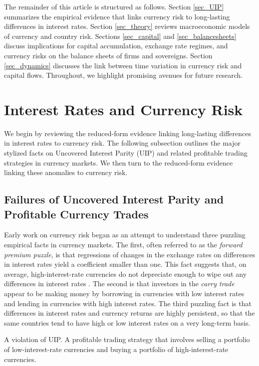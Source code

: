 \documentclass{ar-1col}
\begin{document}
The remainder of this article is structured as follows. Section \ref{sec_UIP} summarizes the empirical evidence that links currency risk to long-lasting differences in interest rates. Section \ref{sec_theory} reviews macroeconomic models of currency and country risk. Sections \ref{sec_capital} and \ref{sec_balancesheets} discuss implications for capital accumulation, exchange rate regimes, and currency risks on the balance sheets of firms and sovereigns.  Section \ref{sec_dynamics} discusses the link between time variation in currency risk and capital flows. Throughout, we highlight promising avenues for future research.


\section{Interest Rates and Currency Risk \label{sec_UIP}}

We begin by reviewing the reduced-form evidence linking long-lasting differences in interest rates to currency risk. The following subsection outlines the major stylized facts on Uncovered Interest Parity (UIP) and related profitable trading strategies in currency markets. We then turn to the reduced-form evidence linking these anomalies to currency risk. 

\subsection{Failures of
  Uncovered Interest Parity and Profitable Currency Trades }

Early work on currency risk began as an attempt to understand three puzzling empirical facts in currency markets. The first, often referred to as the \textit{forward premium puzzle}, is that regressions of changes in the exchange rates on differences in interest rates yield a coefficient smaller than one. This fact suggests that, on average, high-interest-rate currencies do not depreciate enough to wipe out any differences in interest rates \citep{Bilson1981, Fama1984}. The second is that investors in the \textit{carry trade} appear to be making money by borrowing in currencies with low interest rates and lending in currencies with high interest rates. The third puzzling fact is that differences in interest rates and currency returns are highly persistent, so that the same countries tend to have high or low interest rates on a very long-term basis.

\begin{marginnote}[]
   {A violation of UIP. A profitable trading strategy that involves selling a portfolio of low-interest-rate currencies and buying a portfolio of high-interest-rate currencies.} 
\end{marginnote}
\end{document}
